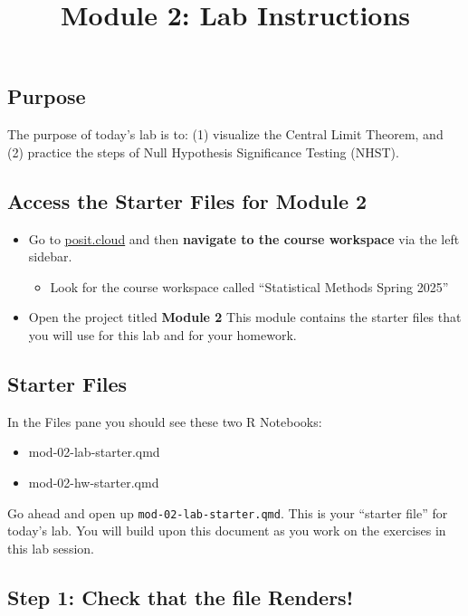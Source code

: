 \documentclass[
  letterpaper,
  DIV=11,
  numbers=noendperiod]{scrartcl}
\title{Module 2: Lab Instructions}
\author{}
\date{}
\providecommand{\tightlist}{%
  \setlength{\itemsep}{0pt}\setlength{\parskip}{0pt}}\usepackage{longtable,booktabs,array}
\begin{document}
\maketitle


\subsection{Purpose}\label{purpose}

The purpose of today's lab is to: (1) visualize the Central Limit
Theorem, and (2) practice the steps of Null Hypothesis Significance
Testing (NHST).

\subsection{Access the Starter Files for Module
2}\label{access-the-starter-files-for-module-2}

\begin{itemize}
\item
  Go to \url{posit.cloud} and then \textbf{navigate to the course
  workspace} via the left sidebar.

  \begin{itemize}
  \tightlist
  \item
    Look for the course workspace called ``Statistical Methods Spring
    2025''
  \end{itemize}
\item
  Open the project titled \textbf{Module 2} This module contains the
  starter files that you will use for this lab and for your homework.
\end{itemize}

\subsection{Starter Files}\label{starter-files}

In the Files pane you should see these two R Notebooks:

\begin{itemize}
\tightlist
\item
  mod-02-lab-starter.qmd
\item
  mod-02-hw-starter.qmd
\end{itemize}

Go ahead and open up \texttt{mod-02-lab-starter.qmd}. This is your
``starter file'' for today's lab. You will build upon this document as
you work on the exercises in this lab session.

\subsection{Step 1: Check that the file
Renders!}\label{step-1-check-that-the-file-renders}
\end{document}
